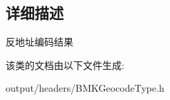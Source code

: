 \subsection{详细描述}
反地址编码结果 

该类的文档由以下文件生成\+:\begin{DoxyCompactItemize}
\item 
output/headers/B\+M\+K\+Geocode\+Type.\+h\end{DoxyCompactItemize}
